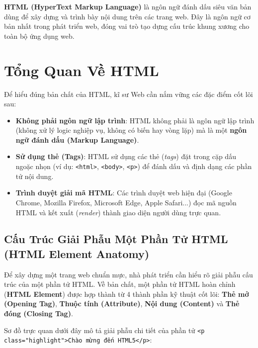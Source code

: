 \documentclass[11pt,oneside]{book}
\newcommand{\codeinline}[1]{\textcolor{accentOrange}{\texttt{#1}}}
\newcommand{\term}[1]{\textbf{\textcolor{primaryBlue}{#1}}}
\begin{document}
\term{HTML (HyperText Markup Language)} là ngôn ngữ đánh dấu siêu văn bản dùng để xây dựng và trình bày nội dung trên các trang web. Đây là ngôn ngữ cơ bản nhất trong phát triển web, đóng vai trò tạo dựng cấu trúc khung xương cho toàn bộ ứng dụng web.

\section{Tổng Quan Về HTML}

Để hiểu đúng bản chất của HTML, kĩ sư Web cần nắm vững các đặc điểm cốt lõi sau:

\begin{itemize}[leftmargin=1.8em, itemsep=4pt, parsep=0pt]
    \item \textbf{Không phải ngôn ngữ lập trình}: HTML không phải là ngôn ngữ lập trình (không xử lý logic nghiệp vụ, không có biến hay vòng lặp) mà là một \term{ngôn ngữ đánh dấu (Markup Language)}.
    \item \textbf{Sử dụng thẻ (Tags)}: HTML sử dụng các thẻ (\textit{tags}) đặt trong cặp dấu ngoặc nhọn (ví dụ: \codeinline{<html>}, \codeinline{<body>}, \codeinline{<p>}) để đánh dấu và định dạng các phần tử nội dung.
    \item \textbf{Trình duyệt giải mã HTML}: Các trình duyệt web hiện đại (Google Chrome, Mozilla Firefox, Microsoft Edge, Apple Safari...) đọc mã nguồn HTML và kết xuất (\textit{render}) thành giao diện người dùng trực quan.
\end{itemize}

\subsection{Cấu Trúc Giải Phẫu Một Phần Tử HTML (HTML Element Anatomy)}

Để xây dựng một trang web chuẩn mực, nhà phát triển cần hiểu rõ giải phẫu cấu trúc của một phần tử HTML. Về bản chất, một phần tử HTML hoàn chỉnh (\term{HTML Element}) được hợp thành từ 4 thành phần kỹ thuật cốt lõi: \textbf{Thẻ mở (Opening Tag)}, \textbf{Thuộc tính (Attribute)}, \textbf{Nội dung (Content)} và \textbf{Thẻ đóng (Closing Tag)}.

Sơ đồ trực quan dưới đây mô tả giải phẫu chi tiết của phần tử \codeinline{<p class="highlight">Chào mừng đến HTML5</p>}:
\end{document}
